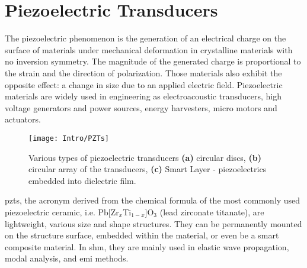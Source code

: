 \section{Piezoelectric Transducers}
\label{sec:PZT}

The piezoelectric phenomenon is the generation of an electrical charge on the surface of materials under mechanical deformation in crystalline materials with no inversion symmetry.
The magnitude of the generated charge is proportional to the strain and the direction of polarization.
Those materials also exhibit the opposite effect: a change in size due to an applied electric field.
Piezoelectric materials are widely used in engineering as electroacoustic transducers, high voltage generators and power sources, energy harvesters, micro motors and actuators.
\begin{figure}[H]
	\texttt{[image: Intro/PZTs]}
	\caption{Various types of piezoelectric transducers \textbf{(a)} circular discs, \textbf{(b)} circular array of the transducers, \textbf{(c)} Smart Layer\textsuperscript{\tiny\textregistered} - piezoelectrics embedded into dielectric film.}
	\label{fig:piezo}
\end{figure}
\Acp{pzt}, the acronym derived from the chemical formula of the most commonly used piezoelectric ceramic, i.e. Pb[Zr\(_x\)Ti\(_{1-x}\)]O\(_3\) (lead zirconate titanate), are lightweight, various size and shape structures. 
They can be permanently mounted on the structure surface, embedded within the material, or even be a smart composite material.
In \ac{shm}, they are mainly used in elastic wave propagation, modal analysis, and \ac{emi} methods.
